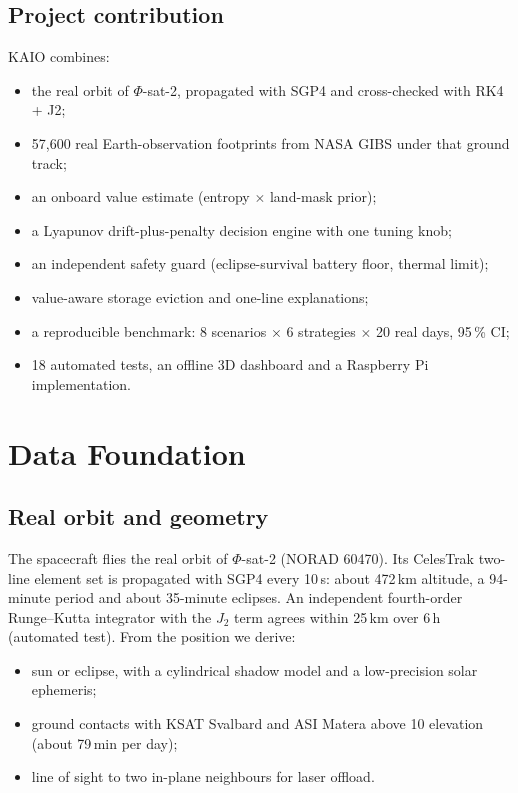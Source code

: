 \documentclass[11pt,a4paper]{article}
\begin{document}
\subsection{Project contribution}
KAIO combines:
\begin{itemize}
  \item the real orbit of $\Phi$-sat-2, propagated with SGP4 and cross-checked with RK4 + J2;
  \item 57,600 real Earth-observation footprints from NASA GIBS under that ground track;
  \item an onboard value estimate (entropy $\times$ land-mask prior);
  \item a Lyapunov drift-plus-penalty decision engine with one tuning knob;
  \item an independent safety guard (eclipse-survival battery floor, thermal limit);
  \item value-aware storage eviction and one-line explanations;
  \item a reproducible benchmark: 8 scenarios $\times$ 6 strategies $\times$ 20 real days, 95\,\% CI;
  \item 18 automated tests, an offline 3D dashboard and a Raspberry Pi implementation.
\end{itemize}

\section{Data Foundation}
\subsection{Real orbit and geometry}
The spacecraft flies the real orbit of $\Phi$-sat-2 (NORAD 60470). Its CelesTrak two-line element set is
propagated with SGP4 every 10\,s: about 472\,km altitude, a 94-minute period and about 35-minute eclipses.
An independent fourth-order Runge--Kutta integrator with the $J_2$ term agrees within 25\,km over 6\,h
(automated test). From the position we derive:
\begin{itemize}
  \item sun or eclipse, with a cylindrical shadow model and a low-precision solar ephemeris;
  \item ground contacts with KSAT Svalbard and ASI Matera above 10\textdegree{} elevation (about 79\,min per day);
  \item line of sight to two in-plane neighbours for laser offload.
\end{itemize}
\end{document}
